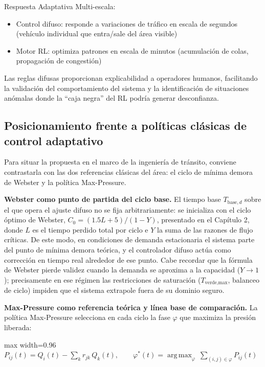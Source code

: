 \documentclass[12pt,a4paper,oneside]{report}
\newenvironment{centeredmath}
  {\begin{center}\begin{adjustbox}{max width=0.96\linewidth}\(\displaystyle}
  {\)\end{adjustbox}\end{center}}
\begin{document}
Respuesta Adaptativa Multi-escala:

\begin{itemize}
\item
  Control difuso: responde a variaciones de tráfico en escala de segundos (vehículo individual que entra/sale del área visible)
\item
  Motor RL: optimiza patrones en escala de minutos (acumulación de colas, propagación de congestión)
\end{itemize}

Las reglas difusas proporcionan explicabilidad a operadores humanos, facilitando la validación del comportamiento del sistema y la identificación de situaciones anómalas donde la ``caja negra'' del RL podría generar desconfianza.

\subsection{Posicionamiento frente a políticas clásicas de control adaptativo}\label{posicionamiento-politicas-clasicas}

Para situar la propuesta en el marco de la ingeniería de tránsito, conviene contrastarla con las dos referencias clásicas del área: el ciclo de mínima demora de Webster y la política Max-Pressure.

\textbf{Webster como punto de partida del ciclo base.} El tiempo base \(T_{\text{base},d}\) sobre el que opera el ajuste difuso no se fija arbitrariamente: se inicializa con el ciclo óptimo de Webster, \(C_{0} = (1.5L + 5)/(1 - Y)\), presentado en el Capítulo 2, donde \(L\) es el tiempo perdido total por ciclo e \(Y\) la suma de las razones de flujo críticas. De este modo, en condiciones de demanda estacionaria el sistema parte del punto de mínima demora teórica, y el controlador difuso actúa como corrección en tiempo real alrededor de ese punto. Cabe recordar que la fórmula de Webster pierde validez cuando la demanda se aproxima a la capacidad (\(Y \rightarrow 1\)); precisamente en ese régimen las restricciones de saturación (\(T_{\text{verde,max}}\), balanceo de ciclo) impiden que el sistema extrapole fuera de su dominio seguro.

\textbf{Max-Pressure como referencia teórica y línea base de comparación.} La política Max-Pressure selecciona en cada ciclo la fase \(\varphi\) que maximiza la presión liberada:

\begin{centeredmath}
P_{ij}(t) = Q_{i}(t) - \sum_{k} r_{jk}\, Q_{k}(t), \qquad
\varphi^{*}(t) = \operatorname*{arg\,max}_{\varphi}\ \sum_{(i,j) \in \varphi} P_{ij}(t)
\end{centeredmath}
\end{document}
